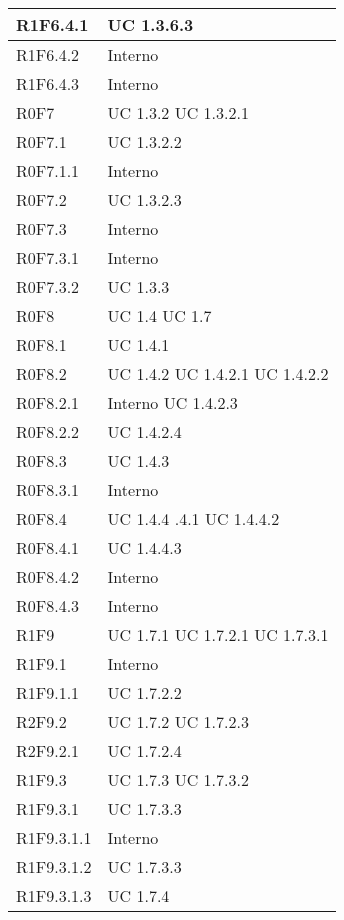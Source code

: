 \begin{center}
\begin{longtable}{| p{4cm} | p{4cm} |}
		\hline
		R1F6.4.1  &  UC 1.3.6.3 \\
		\hline
		R1F6.4.2  &  Interno \\
		\hline
		R1F6.4.3  &  Interno \\
		\hline
		R0F7  &  UC 1.3.2 \newline UC 1.3.2.1 \\
		\hline
		R0F7.1  &  UC 1.3.2.2 \\
		\hline
		R0F7.1.1  &  Interno \\
		\hline
		R0F7.2  &  UC 1.3.2.3 \\
		\hline
		R0F7.3  &  Interno \\
		\hline
		R0F7.3.1  &  Interno \\
		\hline
		R0F7.3.2  &  UC 1.3.3 \\
		\hline
		R0F8  &  UC 1.4 \newline UC 1.7 \\
		\hline
		R0F8.1  &  UC 1.4.1 \\
		\hline
		R0F8.2  &  UC 1.4.2 \newline UC 1.4.2.1 \newline UC 1.4.2.2 \\
		\hline
		R0F8.2.1  &  Interno \newline UC 1.4.2.3 \\
		\hline
		R0F8.2.2  &  UC 1.4.2.4 \\
		\hline
		R0F8.3  &  UC 1.4.3 \\
		\hline
		R0F8.3.1  &  Interno \\
		\hline
		R0F8.4  &  UC 1.4.4 \newline 1.4.4.1 \newline UC 1.4.4.2 \\
		\hline
		R0F8.4.1  &  UC 1.4.4.3 \\
		\hline
		R0F8.4.2  &  Interno \\
		\hline
		R0F8.4.3  &  Interno \\
		\hline
		R1F9  &  UC 1.7.1 \newline UC 1.7.2.1 \newline UC 1.7.3.1 \\
		\hline
		R1F9.1  &  Interno \\
		\hline
		R1F9.1.1  &  UC 1.7.2.2 \\
		\hline
		R2F9.2  &  UC 1.7.2 \newline UC 1.7.2.3  \\
		\hline
		R2F9.2.1  &  UC 1.7.2.4 \\
		\hline
		R1F9.3  & UC 1.7.3  \newline UC 1.7.3.2 \\
		\hline
		R1F9.3.1  &  UC 1.7.3.3\\
		\hline
		R1F9.3.1.1  &  Interno \\
		\hline
		R1F9.3.1.2  &  UC 1.7.3.3\\
		\hline
		R1F9.3.1.3  &  UC 1.7.4\\
		\hline



\end{longtable}
\end{center}
